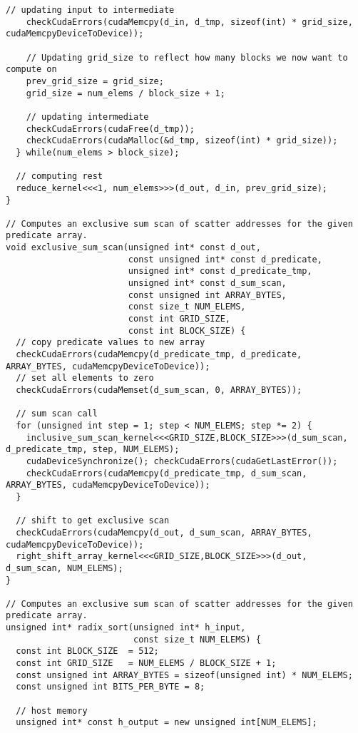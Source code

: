 \begin{lstlisting}[captionpos=t, xleftmargin=0.0pt, xrightmargin=0.0pt, caption={Radix Sort implementation}, label={lst:radix sort full}]
    // updating input to intermediate
    checkCudaErrors(cudaMemcpy(d_in, d_tmp, sizeof(int) * grid_size, cudaMemcpyDeviceToDevice));

    // Updating grid_size to reflect how many blocks we now want to compute on
    prev_grid_size = grid_size;
    grid_size = num_elems / block_size + 1;      

    // updating intermediate
    checkCudaErrors(cudaFree(d_tmp));
    checkCudaErrors(cudaMalloc(&d_tmp, sizeof(int) * grid_size));
  } while(num_elems > block_size);

  // computing rest
  reduce_kernel<<<1, num_elems>>>(d_out, d_in, prev_grid_size);
}

// Computes an exclusive sum scan of scatter addresses for the given predicate array.
void exclusive_sum_scan(unsigned int* const d_out,
                        const unsigned int* const d_predicate,
                        unsigned int* const d_predicate_tmp,
                        unsigned int* const d_sum_scan,
                        const unsigned int ARRAY_BYTES,
                        const size_t NUM_ELEMS,
                        const int GRID_SIZE,
                        const int BLOCK_SIZE) {
  // copy predicate values to new array
  checkCudaErrors(cudaMemcpy(d_predicate_tmp, d_predicate, ARRAY_BYTES, cudaMemcpyDeviceToDevice));
  // set all elements to zero 
  checkCudaErrors(cudaMemset(d_sum_scan, 0, ARRAY_BYTES));

  // sum scan call
  for (unsigned int step = 1; step < NUM_ELEMS; step *= 2) {
    inclusive_sum_scan_kernel<<<GRID_SIZE,BLOCK_SIZE>>>(d_sum_scan, d_predicate_tmp, step, NUM_ELEMS);
    cudaDeviceSynchronize(); checkCudaErrors(cudaGetLastError());
    checkCudaErrors(cudaMemcpy(d_predicate_tmp, d_sum_scan, ARRAY_BYTES, cudaMemcpyDeviceToDevice));
  }

  // shift to get exclusive scan
  checkCudaErrors(cudaMemcpy(d_out, d_sum_scan, ARRAY_BYTES, cudaMemcpyDeviceToDevice));
  right_shift_array_kernel<<<GRID_SIZE,BLOCK_SIZE>>>(d_out, d_sum_scan, NUM_ELEMS);
}

// Computes an exclusive sum scan of scatter addresses for the given predicate array.
unsigned int* radix_sort(unsigned int* h_input,
                         const size_t NUM_ELEMS) {
  const int BLOCK_SIZE  = 512;
  const int GRID_SIZE   = NUM_ELEMS / BLOCK_SIZE + 1;
  const unsigned int ARRAY_BYTES = sizeof(unsigned int) * NUM_ELEMS;
  const unsigned int BITS_PER_BYTE = 8;

  // host memory
  unsigned int* const h_output = new unsigned int[NUM_ELEMS];


\end{lstlisting}
